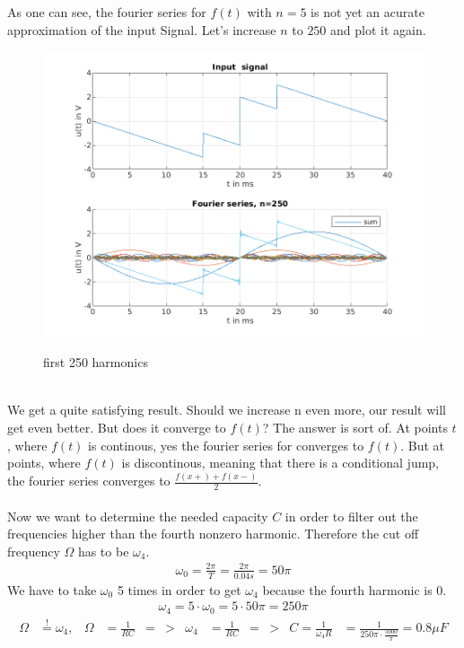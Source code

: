 \documentclass[a4paper]{article}
\begin{document}
\clearpage
As one can see, the fourier series for $f(t)$ with $n=5$ is not yet an acurate approximation of
the input Signal. Let's increase $n$ to  $250$ and plot it again.
\begin{figure}[h!] \centering
  \includegraphics{"./Figures/fourier_n250.png"}
  \label{fig:fourier250}
  \caption{first 250 harmonics}
\end{figure}
\\
We get a quite satisfying result. Should we increase n even more, our result will get even better.
But does it converge to $f(t)$? The answer is sort of. At points $t$, where  $f(t)$ is continous,
yes the fourier series for converges to $f(t)$. But at points, where $f(t)$ is discontinous, meaning
that there is a conditional jump, the fourier series converges to  $\frac{f(x+) + f(x-)}{2}$.
\\
\\
Now we want to determine the needed capacity $C$ in order to filter out the frequencies higher than the fourth nonzero harmonic.
Therefore the cut off frequency $\Omega$ has to be $\omega_4$.\\
\begin{align*}
	\omega_0 = \frac{2\pi}{T} = \frac{2\pi}{0.04s} = 50\pi
\end{align*}
We have to take $\omega_0$ 5 times in order to get $\omega_4$ because the fourth harmonic is 0.
\begin{align*}
	\omega_4 = 5 \cdot \omega_0 = 5 \cdot 50\pi = 250\pi
\end{align*}
\begin{align*}
	\Omega &\overset{!}{=} \omega_4,& \Omega &= \frac{1}{RC}& =&>& \omega_4 &= \frac{1}{RC}& =&>& 
	C = \frac{1}{\omega_4R} &= \frac{1}{250\pi \cdot \frac{5000}{\pi}} = 0.8\mu F \\
\end{align*}
\end{document}
